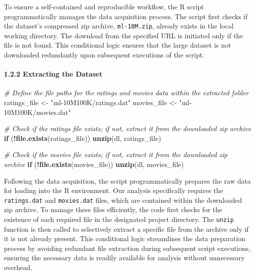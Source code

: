 \documentclass[
]{article}
\newenvironment{Shaded}{\begin{snugshade}}{\end{snugshade}}
\newcommand{\CommentTok}[1]{\textcolor[rgb]{0.56,0.35,0.01}{\textit{#1}}}
\newcommand{\ControlFlowTok}[1]{\textcolor[rgb]{0.13,0.29,0.53}{\textbf{#1}}}
\newcommand{\FunctionTok}[1]{\textcolor[rgb]{0.13,0.29,0.53}{\textbf{#1}}}
\newcommand{\NormalTok}[1]{#1}
\newcommand{\OtherTok}[1]{\textcolor[rgb]{0.56,0.35,0.01}{#1}}
\newcommand{\SpecialCharTok}[1]{\textcolor[rgb]{0.81,0.36,0.00}{\textbf{#1}}}
\newcommand{\StringTok}[1]{\textcolor[rgb]{0.31,0.60,0.02}{#1}}
\begin{document}
To ensure a self-contained and reproducible workflow, the R script
programmatically manages the data acquisition process. The script first
checks if the dataset's compressed zip archive, \texttt{ml-10M.zip},
already exists in the local working directory. The download from the
specified URL is initiated only if the file is not found. This
conditional logic ensures that the large dataset is not downloaded
redundantly upon subsequent executions of the script.

\paragraph{1.2.2 Extracting the Dataset}\label{extracting-the-dataset}

\begin{Shaded}
\begin{Highlighting}[]
\CommentTok{\# Define the file paths for the ratings and movies data within the extracted folder}
\NormalTok{ratings\_file }\OtherTok{\textless{}{-}} \StringTok{"ml{-}10M100K/ratings.dat"}
\NormalTok{movies\_file  }\OtherTok{\textless{}{-}} \StringTok{"ml{-}10M100K/movies.dat"}

\CommentTok{\# Check if the ratings file exists; if not, extract it from the downloaded zip archive}
\ControlFlowTok{if}\NormalTok{ (}\SpecialCharTok{!}\FunctionTok{file.exists}\NormalTok{(ratings\_file)) }\FunctionTok{unzip}\NormalTok{(dl, ratings\_file)}

\CommentTok{\# Check if the movies file exists; if not, extract it from the downloaded zip archive}
\ControlFlowTok{if}\NormalTok{ (}\SpecialCharTok{!}\FunctionTok{file.exists}\NormalTok{(movies\_file)) }\FunctionTok{unzip}\NormalTok{(dl, movies\_file)}
\end{Highlighting}
\end{Shaded}

Following the data acquisition, the script programmatically prepares the
raw data for loading into the R environment. Our analysis specifically
requires the \texttt{ratings.dat} and \texttt{movies.dat} files, which
are contained within the downloaded zip archive. To manage these files
efficiently, the code first checks for the existence of each required
file in the designated project directory. The \texttt{unzip} function is
then called to selectively extract a specific file from the archive only
if it is not already present. This conditional logic streamlines the
data preparation process by avoiding redundant file extraction during
subsequent script executions, ensuring the necessary data is readily
available for analysis without unnecessary overhead.
\end{document}
